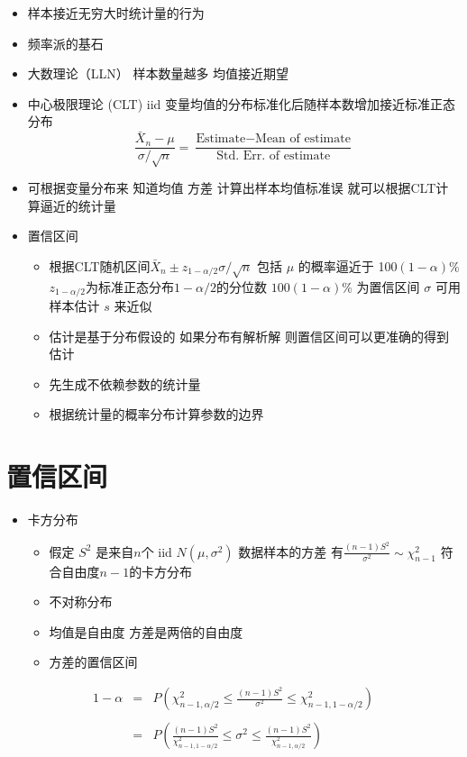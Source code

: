 \documentclass[]{book}
\providecommand{\tightlist}{%
  \setlength{\itemsep}{0pt}\setlength{\parskip}{0pt}}
\begin{document}
\begin{itemize}
\tightlist
\item
  样本接近无穷大时统计量的行为
\item
  频率派的基石
\item
  大数理论（LLN） 样本数量越多 均值接近期望
\item
  中心极限理论 (CLT) iid 变量均值的分布标准化后随样本数增加接近标准正态分布
  \[
  \frac{\bar X_n - \mu}{\sigma / \sqrt{n}} = 
    \frac{\mbox{Estimate} - \mbox{Mean of estimate}}{\mbox{Std. Err. of estimate}}
  \]
\item
  可根据变量分布来 知道均值 方差 计算出样本均值标准误 就可以根据CLT计算逼近的统计量
\item
  置信区间

  \begin{itemize}
  \tightlist
  \item
    根据CLT随机区间\(\bar X_n \pm z_{1-\alpha/2}\sigma / \sqrt{n}\) 包括 \(\mu\) 的概率逼近于 100\((1-\alpha)\)\% \(z_{1-\alpha/2}\)为标准正态分布\(1-\alpha/2\)的分位数 \(100(1 - \alpha)\)\% 为置信区间 \(\sigma\) 可用样本估计 \(s\) 来近似
  \item
    估计是基于分布假设的 如果分布有解析解 则置信区间可以更准确的得到估计
  \item
    先生成不依赖参数的统计量
  \item
    根据统计量的概率分布计算参数的边界
  \end{itemize}
\end{itemize}

\section{置信区间}

\begin{itemize}
\tightlist
\item
  卡方分布

  \begin{itemize}
  \tightlist
  \item
    假定 \(S^2\) 是来自\(n\)个 iid \(N(\mu,\sigma^2)\) 数据样本的方差 有\(\frac{(n - 1) S^2}{\sigma^2} \sim \chi^2_{n-1}\) 符合自由度\(n-1\)的卡方分布
  \item
    不对称分布
  \item
    均值是自由度 方差是两倍的自由度
  \item
    方差的置信区间
  \end{itemize}
\end{itemize}

\begin{eqnarray*}
  1 - \alpha & = & P \left( \chi^2_{n-1, \alpha/2} \leq  \frac{(n - 1) S^2}{\sigma^2} \leq  \chi^2_{n-1,1 - \alpha/2} \right) \\ \\
& = &  P\left(\frac{(n-1)S^2}{\chi^2_{n-1,1-\alpha/2}} \leq \sigma^2 \leq 
\frac{(n-1)S^2}{\chi^2_{n-1,\alpha/2}} \right) \\
\end{eqnarray*}
\end{document}
